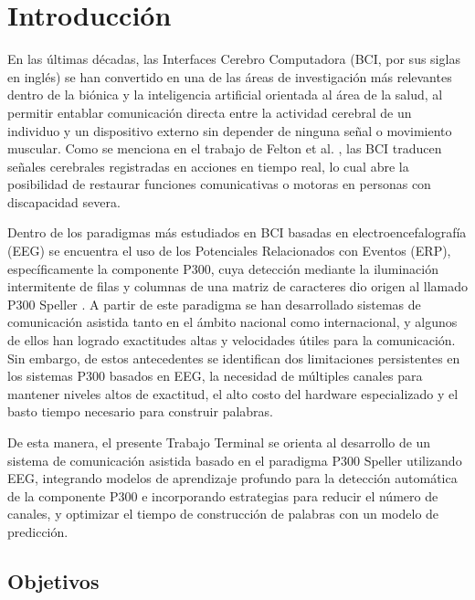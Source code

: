 \chapter[INTRODUCCIÓN]{Introducción}
En las últimas décadas, las Interfaces Cerebro Computadora (BCI, por sus siglas en inglés) se
han convertido en una de las áreas de investigación más relevantes dentro de la biónica y la
inteligencia artificial orientada al área de la salud, al permitir entablar comunicación directa
entre la actividad cerebral de un individuo y un dispositivo externo sin depender de ninguna
señal o movimiento muscular. Como se menciona en el trabajo de Felton et al. \cite{felton2007},
las BCI traducen señales cerebrales registradas en acciones en tiempo real, lo cual abre la
posibilidad de restaurar funciones comunicativas o motoras en personas con discapacidad severa.

Dentro de los paradigmas más estudiados en BCI basadas en electroencefalografía (EEG) se
encuentra el uso de los Potenciales Relacionados con Eventos (ERP), específicamente la
componente P300, cuya detección mediante la iluminación intermitente de filas y columnas de
una matriz de caracteres dio origen al llamado P300 Speller \cite{farwell1988}. A partir de este
paradigma se han desarrollado sistemas de comunicación asistida tanto en el ámbito nacional
como internacional, y algunos de ellos han logrado exactitudes altas y velocidades útiles para
la comunicación. Sin embargo, de estos antecedentes se
identifican dos limitaciones persistentes en los sistemas P300 basados en EEG, la necesidad de
múltiples canales para mantener niveles altos de exactitud, el alto costo del hardware especializado
y el basto tiempo necesario para construir palabras.

De esta manera, el presente Trabajo Terminal se orienta al desarrollo de un sistema de
comunicación asistida basado en el paradigma P300 Speller utilizando EEG, integrando modelos
de aprendizaje profundo para la detección automática de la componente P300 e incorporando
estrategias para reducir el número de canales, y optimizar el tiempo de construcción de palabras con 
un modelo de predicción.

\section[OBJETIVOS]{Objetivos}

